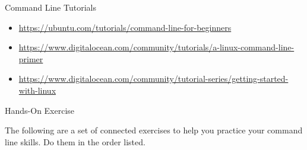 \documentclass[ignorenonframetext,xcolor=dvipsnames]{beamer}
\begin{document}
\begin{frame}{Command Line Tutorials}
\begin{itemize}
\item \url{https://ubuntu.com/tutorials/command-line-for-beginners}
\item \url{https://www.digitalocean.com/community/tutorials/a-linux-command-line-primer}
\item \url{https://www.digitalocean.com/community/tutorial-series/getting-started-with-linux}
\end{itemize}
\end{frame}

\begin{frame}[allowframebreaks]{Hands-On Exercise}

The following are a set of connected exercises to help you practice your command line skills. Do them in the order listed.


\end{frame}
\end{document}
